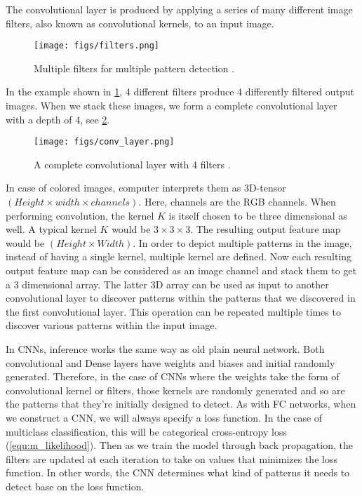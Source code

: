 The convolutional layer is produced by applying a series of many different image filters, also known as convolutional kernels, to an input image.

\begin{figure}[!htbp]
  \centering
  \texttt{[image: figs/filters.png]}
  \caption{Multiple filters for multiple pattern detection \cite{ud188}.}\label{fig:mfmp}
\end{figure}

In the example shown in \cref{fig:mfmp}, 4 different filters produce 4 differently filtered output images.
When we stack these images, we form a complete convolutional layer with a depth of 4, see \cref{fig:conv_layer}.

\begin{figure}[!htbp]
  \centering
  \texttt{[image: figs/conv\_layer.png]}
  \caption{A complete convolutional layer with 4 filters \cite{ud188}.}\label{fig:conv_layer}
\end{figure}

In case of colored images, computer interprets them as 3D-tensor $(Height \times width \times channels)$. Here, channels are the RGB channels. When
performing convolution, the kernel $K$ is itself chosen to be three dimensional as well. A typical kernel $K$ would be $3 \times 3 \times 3$. The
resulting output feature map would be $(Height \times Width)$. In order to depict multiple patterns in the image, instead of having a single kernel,
multiple kernel are defined. Now each resulting output feature map can be considered as an image channel and stack them to get a 3 dimensional
array. The latter 3D array can be used as input to another convolutional layer to discover patterns within the patterns that we discovered in the
first convolutional layer. This operation can be repeated multiple times to discover various patterns within the input image.

In CNNs, inference works the same way as old plain neural network. Both convolutional and Dense layers have weights and biases and initial
randomly generated. Therefore, in the case of CNNs where the weights take the form of convolutional kernel or filters, those kernels are randomly
generated and so are the patterns that they're initially designed to detect. As with FC networks, when we construct a CNN, we will
always specify a loss function. In the case of multiclass classification, this will be categorical cross-entropy loss (\cref{equ:m_likelihood}). Then as
we train the model through back propagation, the filters are updated at each iteration to take on values that minimizes the loss function. In other
words, the CNN determines what kind of patterns it needs to detect base on the loss function.

